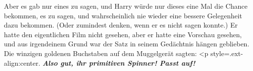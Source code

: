 Aber es gab nur eines zu sagen, und Harry würde nur dieses eine Mal die Chance
bekommen, es zu sagen, und wahrscheinlich nie wieder eine bessere Gelegenheit
dazu bekommen. (Oder zumindest denken, wenn er es nicht sagen konnte.) Er hatte
den eigentlichen Film nicht gesehen, aber er hatte eine Vorschau gesehen, und
aus irgendeinem Grund war der Satz in seinem Gedächtnis hängen geblieben. Die
winzigen goldenen Buchstaben auf dem Muggelgerät sagten: <p
style=\grqq{}.ext-align:center\grqq{}. \textbf{\emph{ Also gut, ihr primitiven
Spinner! Passt auf!}}

